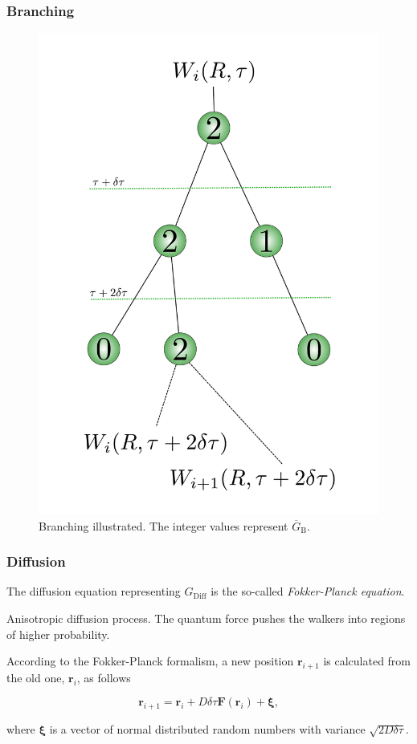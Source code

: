 \begin{frame}
\frametitle{Branching}

\begin{figure}
\begin{center}
\includegraphics[scale=0.2]{../graphics/branching.pdf}
\end{center}
\caption{Branching illustrated. The integer values represent $\overline{G}_\mathrm{B}$.}
\end{figure}

\end{frame}

\begin{frame}
 \frametitle{Diffusion}
 
 The diffusion equation representing $G_\mathrm{Diff}$ is the so-called \textit{Fokker-Planck equation}. 
 \shift
 
 Anisotropic diffusion process. The quantum force pushes the walkers into regions of higher probability. 
 \shift
 
 According to the Fokker-Planck formalism, a new position $\mathbf{r}_{i+1}$ is calculated from the old one, $\mathbf{r}_i$, as follows
 
 \begin{equation}
  \mathbf{r}_{i+1} = \mathbf{r}_i + D\delta\tau\mathbf{F}(\mathbf{r}_i) + \mathbf{\xi}, 
 \end{equation}

where $\mathbf{\xi}$ is a vector of normal distributed random numbers with variance $\sqrt{2D\delta\tau}$.
 
\end{frame}

